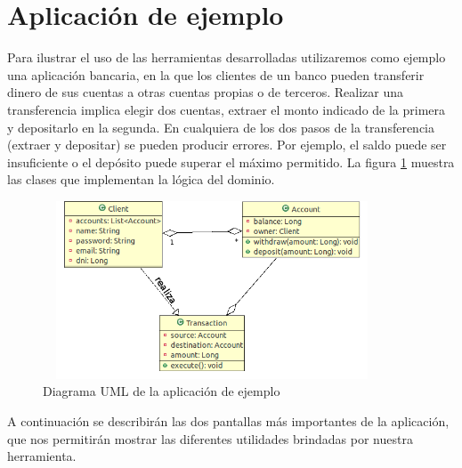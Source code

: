 \section{Aplicación de ejemplo}
\label{Example}
Para ilustrar el uso de las herramientas desarrolladas utilizaremos como ejemplo
una aplicación bancaria, en la que los clientes de un banco pueden transferir
dinero de sus cuentas a otras cuentas propias o de terceros. 
Realizar una transferencia implica elegir dos cuentas, extraer el
monto indicado de la primera y depositarlo en la segunda. 
En cualquiera de los dos pasos de la transferencia (extraer y depositar) se
pueden producir errores.
Por ejemplo, el saldo puede ser insuficiente o el depósito puede superar el
máximo permitido.
La figura \ref{example} muestra las clases que implementan la lógica del
dominio.

	\begin{figure}[h!]
		\centering
		\includegraphics[width=380px, height=200px]{img/transaccion}
		\caption{Diagrama UML de la aplicación de ejemplo}
		\label{example}
	\end{figure}	

A continuación se describirán las dos pantallas más importantes de la
aplicación, que nos permitirán mostrar las diferentes utilidades brindadas por
nuestra herramienta.
 

